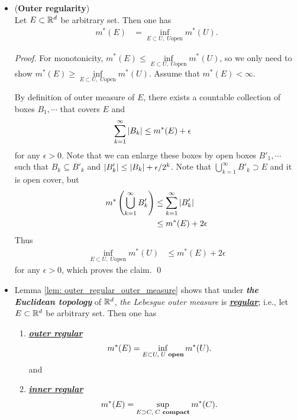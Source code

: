 \documentclass[11pt]{article}
\begin{document}
\begin{itemize}
\item \begin{lemma}  \label{lem: outer_regular_outer_measure} (\textbf{Outer regularity})  \citep{tao2011introduction} \\
Let $E\subset {\mathbb R}^{d}$ be arbitrary set.  Then one has
\begin{align*}
m^{*}(E) &= \inf\limits_{E\subset U, \;U\text{open}}m^{*}(U). 
\end{align*}
\end{lemma}
\begin{proof}
For monotonicity, $m^{*}(E) \le \inf\limits_{E\subset U, \;U\text{open}}m^{*}(U)$, so we only need to show $m^{*}(E) \ge \inf\limits_{E\subset U, \;U\text{open}}m^{*}(U)$. Assume that $m^{*}(E)< \infty$. 

By definition of outer measure of $E$, there exists a countable collection of boxes $B_{1},\cdots$ that covers $E$ and 
\begin{align*}
\sum_{k=1}^{\infty}\left\lvert B_{k} \right\rvert &\le m^{*}(E) + \epsilon
\end{align*}
for any $\epsilon>0$. Note that we can enlarge these boxes by open boxes $B'_{1},\cdots$ such that $B_{k}\subseteq B'_{k}$ and $\left\lvert B'_{k} \right\rvert\le \left\lvert B_{k} \right\rvert+ \epsilon/2^{k}$. Note that $\bigcup_{k=1}^{\infty}B'_{k} \supset E$ and it is open cover, but 
\begin{align*}
m^{*}\left(\bigcup_{k=1}^{\infty}B'_{k}\right)&\le \sum_{k=1}^{\infty}\left\lvert B'_{k} \right\rvert \\
&\le m^{*}(E) + 2\epsilon
\end{align*}
Thus
\begin{align*}
\inf\limits_{E\subset U, \;U\text{open}}m^{*}(U) &\le m^{*}(E) + 2\epsilon
\end{align*} for any $\epsilon>0$, which proves the claim. \qed
\end{proof}

\item \begin{remark}
Lemma \ref{lem: outer_regular_outer_measure} shows that under \emph{\textbf{the Euclidean topology}} of ${\mathbb R}^{d}$, \emph{the Lebesgue outer measure} is \underline{\emph{\textbf{regular}}}; i.e.,  let $E\subset {\mathbb R}^{d}$ be arbitrary set.  Then one has
\begin{enumerate}
\item \underline{\emph{\textbf{outer regular}}} 
\begin{align}
m^{*}(E) &= \inf\limits_{E\subset U, \;U\text{ \textbf{open}}}m^{*}(U). \label{expr: outer_regular}
\end{align} and
\item \underline{\emph{\textbf{inner regular}}}
\begin{align}
m^{*}(E) &= \sup\limits_{E\supset C, \;C\text{ \textbf{compact}}}m^{*}(C). \label{expr: inner_regular}
\end{align}
\end{enumerate}
\end{remark}


\end{itemize}
\end{document}

